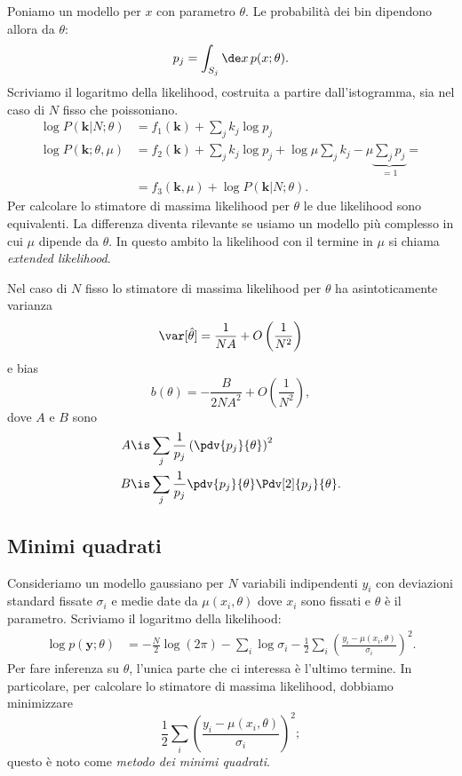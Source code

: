 Poniamo un modello per $x$ con parametro $\theta$.
Le probabilità dei bin dipendono allora da $\theta$:
\begin{equation*}
	p_j = \int_{S_j} \de x\, p(x;\theta).
\end{equation*}
Scriviamo il logaritmo della likelihood,
costruita a partire dall'istogramma,
sia nel caso di $N$ fisso che poissoniano.
\begin{align*}
	\log P(\mathbf k|N;\theta)
	&= f_1(\mathbf k) + \sum_j k_j\log p_j \\
	\log P(\mathbf k;\theta,\mu)
	&= f_2(\mathbf k) + \sum_j k_j\log p_j
	+ \log\mu\sum_jk_j - \mu\underbrace{\sum_jp_j}\limits_{=1} = \\
	&= f_3(\mathbf k,\mu) + \log P(\mathbf k|N;\theta).
\end{align*}
Per calcolare lo stimatore di massima likelihood per $\theta$ le due likelihood sono equivalenti.
La differenza diventa rilevante se usiamo un modello più complesso in cui $\mu$ dipende da $\theta$.
In questo ambito la likelihood con il termine in $\mu$ si chiama \emph{extended likelihood}.

\begin{fact}
	Nel caso di $N$ fisso lo stimatore di massima likelihood per $\theta$ ha asintoticamente varianza
	\begin{equation*}
		\var[\hat\theta]
		= \frac1{NA} + O\left(\frac1{N^2}\right)
	\end{equation*}
	e bias
	\begin{equation*}
		b(\theta)
		= -\frac B{2NA^2} + O\left(\frac1{N^2}\right),
	\end{equation*}
	dove $A$ e $B$ sono
	\begin{align*}
		A
		&\is \sum_j \frac1{p_j} \left(\pdv{p_j}{\theta}\right)^2 \\
		B
		&\is \sum_j \frac1{p_j} \pdv{p_j}{\theta} \Pdv[2]{p_j}{\theta}.
	\end{align*}
\end{fact}


\subsection{Minimi quadrati}

Consideriamo un modello gaussiano per $N$ variabili indipendenti $y_i$
con deviazioni standard fissate $\sigma_i$
e medie date da $\mu(x_i,\theta)$ dove $x_i$ sono fissati e $\theta$ è il parametro.
Scriviamo il logaritmo della likelihood:
\begin{align*}
	\log p(\mathbf y;\theta)
	&= -\frac N2\log(2\pi)
	- \sum_i\log\sigma_i
	- \frac12 \sum_i \left( \frac{y_i - \mu(x_i,\theta)}{\sigma_i} \right)^2.
\end{align*}
Per fare inferenza su $\theta$, l'unica parte che ci interessa è l'ultimo termine.
In particolare, per calcolare lo stimatore di massima likelihood, dobbiamo minimizzare
\begin{equation*}
	\frac12 \sum_i \left( \frac{y_i - \mu(x_i,\theta)}{\sigma_i} \right)^2;
\end{equation*}
questo è noto come \emph{metodo dei minimi quadrati}.

